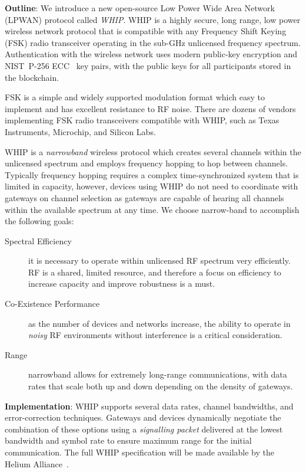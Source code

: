 \documentclass[letterpaper,11pt]{article}
\begin{document}
\textbf{Outline}: We introduce a new open-source Low Power Wide Area Network (LPWAN) protocol called \emph{WHIP}. WHIP is a highly secure, long range, low power wireless network protocol that is compatible with any Frequency Shift Keying (FSK) radio transceiver operating in the sub-GHz unlicensed frequency spectrum. Authentication with the wireless network uses modern public-key encryption and NIST~P-256 ECC~\cite{ecc} key pairs, with the public keys for all participants stored in the blockchain.

FSK is a simple and widely supported modulation format which easy to implement and has excellent resistance to RF noise. There are dozens of vendors implementing FSK radio transceivers compatible with WHIP, such as Texas Instruments, Microchip, and Silicon Labs.

WHIP is a \emph{narrowband} wireless protocol which creates several channels within the unlicensed spectrum and employs frequency hopping to hop between channels. Typically frequency hopping requires a complex time-synchronized system that is limited in capacity, however, devices using WHIP do not need to coordinate with gateways on channel selection as gateways are capable of hearing all channels within the available spectrum at any time. We choose narrow-band to accomplish the following goals:

\begin{description}
  \item[Spectral Efficiency] it is necessary to operate within unlicensed RF spectrum very efficiently. RF is a shared, limited resource, and therefore a focus on efficiency to increase capacity and improve robustness is a must.
  \item[Co-Existence Performance] as the number of devices and networks increase, the ability to operate in \emph{noisy} RF environments without interference is a critical consideration.
  \item[Range] narrowband allows for extremely long-range communications, with data rates that scale both up and down depending on the density of gateways.
\end{description}

\textbf{Implementation}: WHIP supports several data rates, channel bandwidths, and error-correction techniques. Gateways and devices dynamically negotiate the combination of these options using a \emph{signalling packet} delivered at the lowest bandwidth and symbol rate to ensure maximum range for the initial communication.
The full WHIP specification will be made available by the Helium Alliance~\cite{alliance}.
\end{document}
